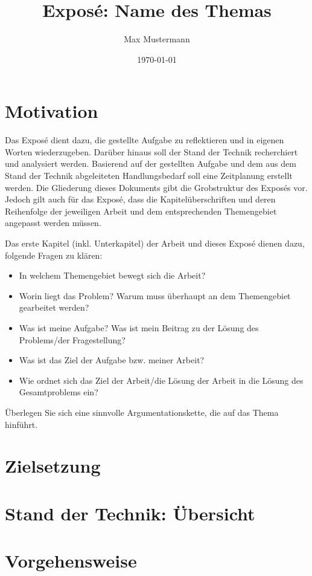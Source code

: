 \documentclass[a4paper]{scrartcl}
\author{Max Mustermann}
\title{Exposé: Name des Themas}
\date{\today}
\begin{document}
\maketitle
	
\section{Motivation}

Das Exposé dient dazu, die gestellte Aufgabe zu reflektieren und in eigenen Worten wiederzugeben. Darüber hinaus soll der Stand der Technik recherchiert und analysiert werden. Basierend auf der gestellten Aufgabe und dem aus dem Stand der Technik abgeleiteten Handlungsbedarf soll eine Zeitplanung erstellt werden. Die Gliederung dieses Dokuments gibt die Grobstruktur des Exposés vor. Jedoch gilt auch für das Exposé, dass die Kapitelüberschriften und deren Reihenfolge der jeweiligen Arbeit und dem entsprechenden Themengebiet angepasst werden müssen.

Das erste Kapitel (inkl. Unterkapitel) der Arbeit und dieses Exposé dienen dazu, folgende Fragen zu klären:

\begin{itemize}
    \item In welchem Themengebiet bewegt sich die Arbeit?
    \item Worin liegt das Problem? Warum muss überhaupt an dem Themengebiet gearbeitet werden?
    \item Was ist meine Aufgabe? Was ist mein Beitrag zu der Lösung des Problems/der Fragestellung?
    \item Was ist das Ziel der Aufgabe bzw. meiner Arbeit?
    \item Wie ordnet sich das Ziel der Arbeit/die Lösung der Arbeit in die Lösung des Gesamtproblems ein?
\end{itemize}

Überlegen Sie sich eine sinnvolle Argumentationskette, die auf das Thema hinführt.


\section{Zielsetzung}

\section{Stand der Technik: Übersicht}

\section{Vorgehensweise}
\end{document}
